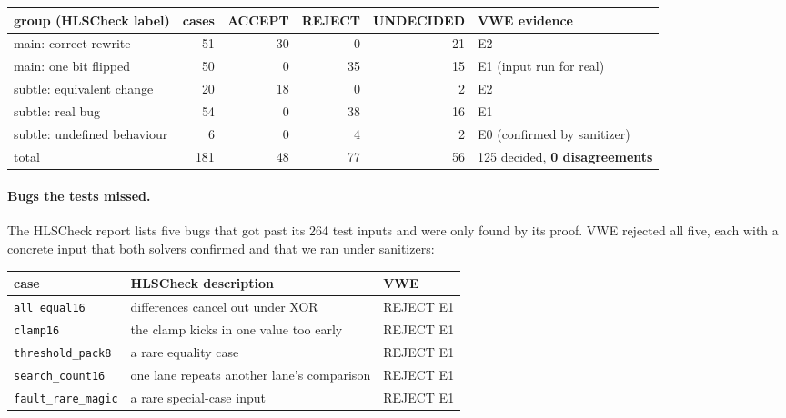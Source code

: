\documentclass[10pt,a4paper]{article}
\begin{document}
\begin{center}\small
\begin{tabular}{@{}lrrrrl@{}}\toprule
group (HLSCheck label) & cases & ACCEPT & REJECT & UNDECIDED & VWE evidence\\\midrule
main: correct rewrite & 51 & 30 & 0 & 21 & E2\\
main: one bit flipped & 50 & 0 & 35 & 15 & E1 (input run for real)\\
subtle: equivalent change & 20 & 18 & 0 & 2 & E2\\
subtle: real bug & 54 & 0 & 38 & 16 & E1\\
subtle: undefined behaviour & 6 & 0 & 4 & 2 & E0 (confirmed by sanitizer)\\\midrule
total & 181 & 48 & 77 & 56 & 125 decided, \textbf{0 disagreements}\\\bottomrule
\end{tabular}\end{center}

\paragraph{Bugs the tests missed.} The HLSCheck report lists five bugs that got past its 264
test inputs and were only found by its proof. VWE rejected all five, each with a concrete input
that both solvers confirmed and that we ran under sanitizers:
\begin{center}\small
\begin{tabular}{@{}lll@{}}\toprule
case & HLSCheck description & VWE\\\midrule
\texttt{all\_equal16} & differences cancel out under XOR & REJECT E1\\
\texttt{clamp16} & the clamp kicks in one value too early & REJECT E1\\
\texttt{threshold\_pack8} & a rare equality case & REJECT E1\\
\texttt{search\_count16} & one lane repeats another lane's comparison & REJECT E1\\
\texttt{fault\_rare\_magic} & a rare special-case input & REJECT E1\\\bottomrule
\end{tabular}\end{center}
\end{document}
